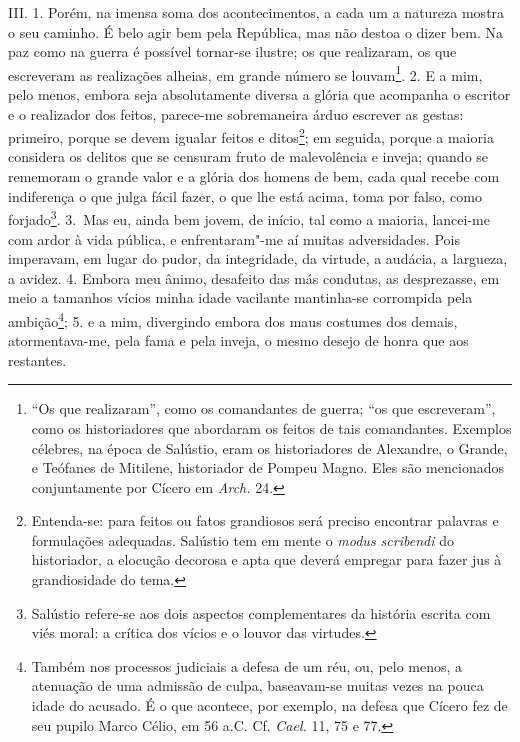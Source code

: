 III. 1. Porém, na imensa soma dos acontecimentos, a cada um a natureza mostra o
seu caminho. É belo agir bem pela República, mas não destoa o dizer bem. Na paz
como na guerra é possível tornar-se ilustre; os que realizaram, os que
escreveram as realizações alheias, em grande número se louvam\footnote{``Os que
realizaram'', como os comandantes de guerra; ``os que escreveram'', como os
historiadores que abordaram os feitos de tais comandantes. Exemplos célebres,
na época de Salústio, eram os historiadores de Alexandre, o Grande, e Teófanes
de Mitilene, historiador de Pompeu Magno. Eles são mencionados conjuntamente
por Cícero em \emph{Arch.} 24.}. 2. E a mim, pelo menos, embora
seja absolutamente diversa a glória que acompanha o escritor e o realizador dos
feitos, parece-me sobremaneira árduo escrever as gestas: primeiro, porque se
devem igualar feitos e ditos\footnote{Entenda-se: para feitos ou fatos
grandiosos será preciso encontrar palavras e formulações adequadas. Salústio tem em mente o
\emph{modus scribendi} do historiador, a elocução decorosa e apta que deverá
empregar para fazer jus à grandiosidade do tema.}; em seguida, porque a maioria
considera os delitos que se censuram fruto de malevolência e inveja; quando se
rememoram o grande valor e a glória dos homens de bem, cada qual recebe com
indiferença o que julga fácil fazer, o que lhe está acima, toma por falso, como
forjado\footnote{Salústio refere-se aos dois aspectos complementares da
história escrita com viés moral: a crítica dos vícios e o louvor das
virtudes.}. 3.~Mas eu, ainda bem jovem, de início, tal como a maioria,
lancei-me com ardor à vida pública, e enfrentaram"-me aí muitas adversidades.
Pois imperavam, em lugar do pudor, da integridade, da virtude, a audácia, a
largueza, a avidez. 4. Embora meu ânimo, desafeito das más condutas, as
desprezasse, em meio a tamanhos vícios minha idade vacilante mantinha-se corrompida pela ambição\footnote{Também
nos processos judiciais a defesa de um réu, ou, pelo menos, a atenuação de uma
admissão de culpa, baseavam-se muitas vezes na pouca idade do acusado. É o que
acontece, por exemplo, na defesa que Cícero fez de seu pupilo Marco Célio, em
56 a.C. Cf. \emph{Cael.} 11, 75 e 77.}; 5. e a mim, divergindo embora dos
maus costumes dos demais, atormentava-me, pela fama e pela inveja, o mesmo
desejo de honra que aos restantes.

